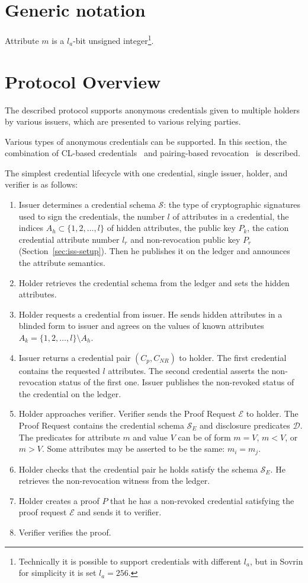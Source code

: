 \section{Generic notation}

Attribute $m$ is a $l_a$-bit unsigned integer\footnote{Technically it is possible to support credentials with different $l_a$, but in Sovrin for simplicity it is set $l_a=256$.}. 


\section{Protocol Overview}

The described protocol supports anonymous credentials given to multiple holders  by various issuers, which are presented to various relying parties.

Various types of anonymous credentials can be supported. In this section, the combination of CL-based credentials~\cite{CamenischL02} and pairing-based revocation~\cite{CamenischKS09} is described.

The simplest credential lifecycle with one credential, single issuer, holder, and verifier is as follows:
\begin{enumerate}
    \item Issuer determines a credential schema $\mathcal{S} $: the type of cryptographic signatures used to sign the credentials, the number $l$ of attributes in a credential, the indices $A_h\subset \{1,2,\ldots,l\}$ of hidden attributes, the public key $P_k$, the cation credential attribute number $l_r$ and non-revocation public key $P_r$ (Section~\ref{sec:iss-setup}). Then he publishes it on the ledger and announces the attribute semantics.
    \item Holder retrieves the credential schema from the ledger and sets the hidden attributes.
    \item Holder requests a credential from issuer. He sends hidden attributes in a blinded form to issuer and agrees on the values of known attributes $A_k=\{1,2,
\ldots,l\}\setminus A_h$.
    \item Issuer returns a credential pair $(C_p, C_{NR})$ to holder. The first credential contains the requested $l$ attributes. The second credential asserts the non-revocation status of the first one. Issuer publishes the non-revoked status of the credential on the ledger.
    \item Holder approaches verifier. Verifier sends the Proof Request $\mathcal{E}$
    to holder. The Proof Request contains the credential schema $\mathcal{S}_E$ and disclosure predicates $\mathcal{D}$. The predicates for attribute $m$ and value $V$ can be of form $m=V$, $m<V$, or $m>V$. Some attributes may be asserted to be the same: $m_i=m_j$.
    \item Holder checks that the credential pair he holds satisfy the schema $\mathcal{S}_E$. 
    He retrieves the non-revocation witness from the ledger.
    \item Holder creates a proof $P$ that he has a non-revoked credential satisfying the proof request $\mathcal{E}$ and sends it to verifier.
    \item Verifier verifies the proof.
\end{enumerate}


